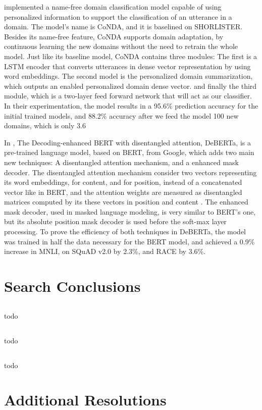 \citet{Li20193784} implemented a name-free domain classification model capable of using personalized information to support the classification of an utterance in a domain. The model’s name is CoNDA, and it is baselined on SHORLISTER. Besides its name-free feature, CoNDA supports domain adaptation, by continuous learning the new domains without the need to retrain the whole model. Just like its baseline model, CoNDA contains three modules: The first is a LSTM encoder that converts utterances in dense vector representation by using word embeddings. The second model is the personalized domain summarization, which outputs an enabled personalized domain dense vector. and finally the third module, which is a two-layer feed forward network that will act as our classifier. In their experimentation, the model results in a 95.6\% prediction accuracy for the initial trained models, and 88.2\% accuracy after we feed the model 100 new domains, which is only 3.6%

In \citet{He202003654}, The Decoding-enhanced BERT with disentangled attention, DeBERTa, is a pre-trained language model, based on BERT, from Google, which adds two main new techniques: A disentangled attention mechanism, and a enhanced mask decoder. The disentangled attention mechanism consider two vectors representing its word embeddings, for content, and for position, instead of a concatenated vector like in BERT, and the attention weights are measured as disentangled matrices computed by its these vectors in position and content . The enhanced mask decoder, used in masked language modeling, is very similar to BERT’s one, but its absolute position mask decoder is used before the soft-max layer processing. To prove the efficiency of both techniques in DeBERTa, the model was trained in half the data necessary for the BERT model, and achieved a 0.9\% increase in MNLI, on SQuAD v2.0 by 2.3\%, and RACE by 3.6\%.

\section{Search Conclusions}

\subsection{\RQI}

todo

\subsection{\RQII}

todo

\subsection{\RQIII}

todo

\section{Additional Resolutions}




